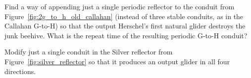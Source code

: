 \begin{multicols}{2}
	
	\mfilbreak
	
	
	\begin{problem}\label{exer:callahan_g_to_h_faster_periodic} 
		Find a way of appending just a single periodic reflector to the conduit from Figure~\ref{fig:2g_to_h_old_callahan} (instead of three stable conduits, as in the Callahan G-to-H) so that the output Herschel's first natural glider destroys the junk beehive. What is the repeat time of the resulting periodic G-to-H conduit?
	\end{problem}
	
	
	\mfilbreak
	
	
	\begin{problemstar}\label{exer:four_dir_silver_reflector} 
		Modify just a single conduit in the Silver reflector from Figure~\ref{fig:silver_reflector} so that it produces an output glider in all four directions.
	\end{problemstar}
	
	
\end{multicols}
\normalsize\vspace*{0.01cm}
